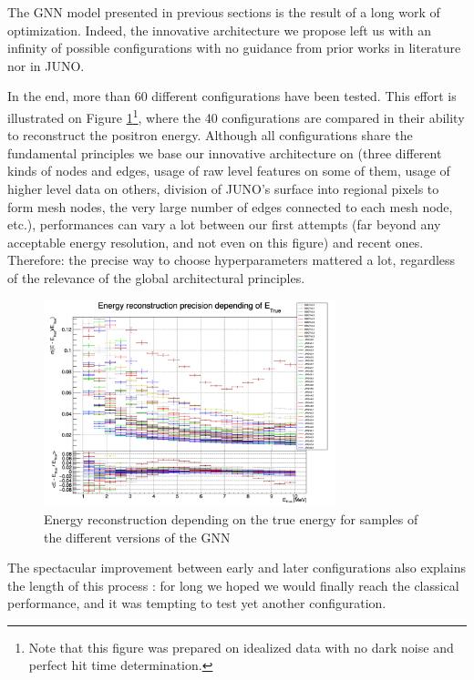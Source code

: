 \documentclass[../main.tex]{subfiles}
\begin{document}
The GNN model presented in previous sections is the result of a long work of optimization. Indeed, the innovative architecture we propose left us with an infinity of possible configurations with no guidance from prior works in literature nor in JUNO.

In the end, more than 60 different configurations have been tested. This effort is illustrated on Figure \ref{fig:jgnn:histor}\footnote{Note that this figure was prepared on idealized data with no dark noise and perfect hit time determination.},
where the 40 configurations are compared in their ability to reconstruct the positron energy. Although all configurations share the fundamental principles we base our innovative architecture on (three different kinds of nodes and edges, usage of raw level features on some of them, usage of higher level data on others, division of JUNO's surface into regional pixels to form mesh nodes, the very large number of edges connected to each mesh node, etc.), performances can vary a lot between our first attempts (far beyond any acceptable energy resolution, and not even on this figure) and recent ones. Therefore: the precise way to choose hyperparameters mattered a lot, regardless of the relevance of the global architectural principles.

\begin{figure}
  \centering
  \includegraphics[height=6cm]{images/jgnn/GNN_Optimization_hist.png}
  \caption{Energy reconstruction depending on the true energy for samples of the different versions of the GNN}
  \label{fig:jgnn:histor}
\end{figure}

The spectacular improvement between early and later configurations also explains the length of this process : for long we hoped we would finally reach the classical performance, and it was tempting to test yet another configuration.

\end{document}
